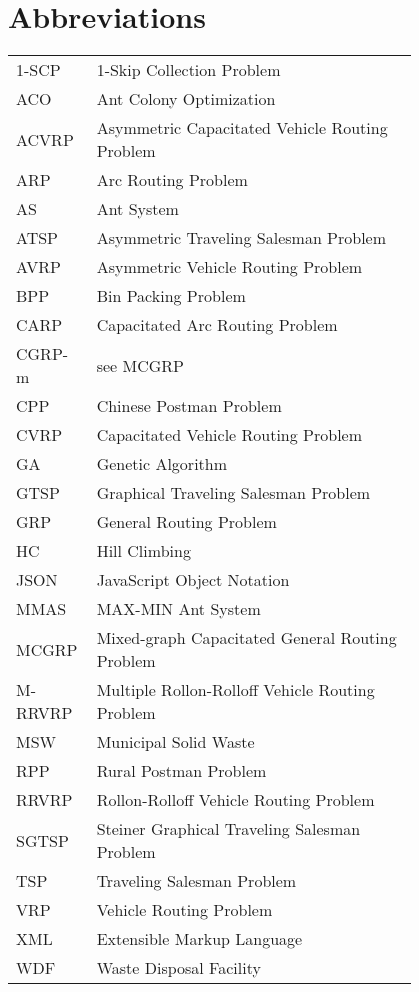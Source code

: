 \chapter*{Abbreviations}

\begin{flushleft}
\begin{tabular}{l p{0.8\linewidth}}
1-SCP	& 1-Skip Collection Problem \\
ACO & Ant Colony Optimization \\
ACVRP	& Asymmetric Capacitated Vehicle Routing Problem \\
ARP	& Arc Routing Problem \\
AS & Ant System \\
ATSP & Asymmetric Traveling Salesman Problem \\
AVRP	& Asymmetric Vehicle Routing Problem \\
BPP	& Bin Packing Problem \\
CARP	& Capacitated Arc Routing Problem \\
CGRP-m	& see MCGRP \\
CPP	& Chinese Postman Problem \\
CVRP & Capacitated Vehicle Routing Problem \\
GA & Genetic Algorithm \\
GTSP & Graphical Traveling Salesman Problem \\
GRP	& General Routing Problem \\
HC & Hill Climbing \\
JSON & JavaScript Object Notation \\
MMAS & MAX-MIN Ant System \\
MCGRP	& Mixed-graph Capacitated General Routing Problem \\
M-RRVRP	& Multiple Rollon-Rolloff Vehicle Routing Problem \\
MSW	& Municipal Solid Waste \\
RPP	& Rural Postman Problem \\
RRVRP	& Rollon-Rolloff Vehicle Routing Problem \\
SGTSP	& Steiner Graphical Traveling Salesman Problem \\
TSP	& Traveling Salesman Problem \\
VRP	& Vehicle Routing Problem \\
XML & Extensible Markup Language \\
WDF & Waste Disposal Facility \\
\end{tabular}
\end{flushleft}

